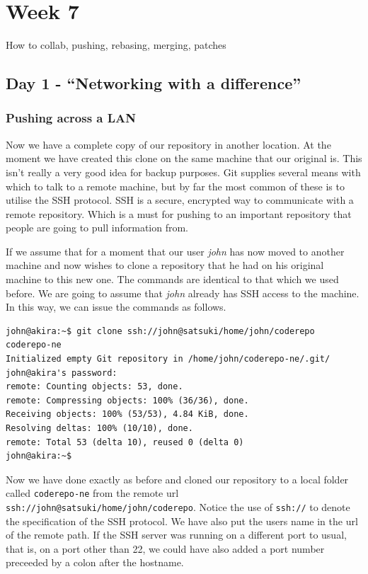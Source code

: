 \cleardoublepage
\chapter{Week 7}

How to collab, pushing, rebasing, merging, patches

\section{Day 1 - ``Networking with a difference''}
\subsection{Pushing across a LAN}

Now we have a complete copy of our repository in another location.  At the moment we have created this clone on the same machine that our original is.  This isn't really a very good idea for backup purposes.  Git supplies several means with which to talk to a remote machine, but by far the most common of these is to utilise the SSH protocol.  SSH is a secure, encrypted way to communicate with a remote repository.  Which is a must for pushing to an important repository that people are going to pull information from.

If we assume that for a moment that our user \emph{john} has now moved to another machine and now wishes to clone a repository that he had on his original machine to this new one.  The commands are identical to that which we used before.  We are going to assume that \emph{john} already has SSH access to the machine.  In this way, we can issue the commands as follows.

\begin{Verbatim}
john@akira:~$ git clone ssh://john@satsuki/home/john/coderepo coderepo-ne
Initialized empty Git repository in /home/john/coderepo-ne/.git/
john@akira's password: 
remote: Counting objects: 53, done.
remote: Compressing objects: 100% (36/36), done.
Receiving objects: 100% (53/53), 4.84 KiB, done.
Resolving deltas: 100% (10/10), done.
remote: Total 53 (delta 10), reused 0 (delta 0)
john@akira:~$ 
\end{Verbatim}

Now we have done exactly as before and cloned our repository to a local folder called \texttt{coderepo-ne} from the remote url \texttt{ssh://john@satsuki/home/john/coderepo}.  Notice the use of \texttt{ssh://} to denote the specification of the SSH protocol.  We have also put the users name in the url of the remote path.  If the SSH server was running on a different port to usual, that is, on a port other than 22, we could have also added a port number preceeded by a colon after the hostname.

